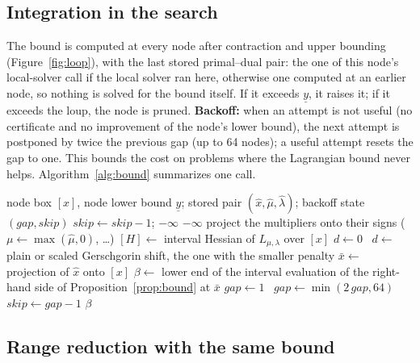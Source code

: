 \documentclass[11pt]{article}
\begin{document}
\subsection{Integration in the search}

The bound is computed at every node after contraction and upper bounding
(Figure~\ref{fig:loop}), with the last stored primal--dual pair: the one of this node's
local-solver call if the local solver ran here, otherwise one computed at an earlier
node, so nothing is
solved for the bound itself. If it exceeds $\underline{y}$, it raises it; if it exceeds
the loup, the node is pruned. \textbf{Backoff:} when an attempt is not useful (no
certificate and no improvement of the node's lower bound), the next attempt is
postponed by twice the previous gap (up to 64 nodes); a useful attempt resets the gap
to one. This bounds the cost on problems where the Lagrangian bound never helps.
Algorithm~\ref{alg:bound} summarizes one call.

\begin{algorithm}[h]
\caption{Lagrangian bound at a node (default mode, certify else shift)}
\label{alg:bound}
\begin{algorithmic}[1]
\Require node box $[x]$, node lower bound $\underline{y}$; stored pair
  $(\hat x, \hat\mu, \hat\lambda)$; backoff state $(\textit{gap}, \textit{skip})$
 $\textit{skip} \gets \textit{skip} - 1$; \Return $-\infty$ \EndIf
{} \Return $-\infty$ \EndIf
\State project the multipliers onto their signs ($\mu \gets \max(\hat\mu, 0)$, \dots)
\State $[H] \gets$ interval Hessian of $L_{\mu,\lambda}$ over $[x]$
 $d \gets 0$
\Else\ $d \gets$ plain or scaled Gerschgorin shift, the one with the smaller penalty
\EndIf
\State $\bar x \gets$ projection of $\hat x$ onto $[x]$
\State $\beta \gets$ lower end of the interval evaluation of the right-hand side of
  Proposition~\ref{prop:bound} at $\bar x$
 $\textit{gap} \gets 1$
\Else\ $\textit{gap} \gets \min(2\,\textit{gap}, 64)$ \EndIf
\State $\textit{skip} \gets \textit{gap} - 1$
\State \Return $\beta$ 
\end{algorithmic}
\end{algorithm}

\subsection{Range reduction with the same bound}\label{sec:red}
\end{document}
